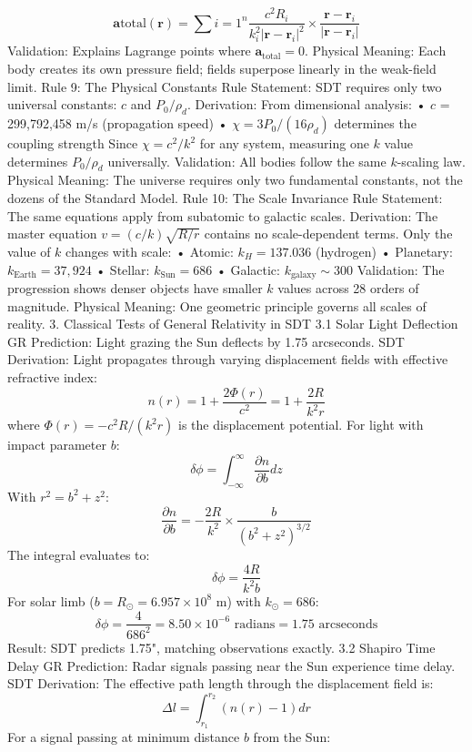 $$\mathbf{a}{\text{total}}(\mathbf{r}) = \sum{i=1}^{n} \frac{c^2R_i}{k_i^2|\mathbf{r} - \mathbf{r}_i|^2} \times \frac{\mathbf{r} - \mathbf{r}_i}{|\mathbf{r} - \mathbf{r}_i|}$$
Validation: Explains Lagrange points where $\mathbf{a}_{\text{total}} = 0$.
Physical Meaning: Each body creates its own pressure field; fields superpose linearly in the weak-field limit.
Rule 9: The Physical Constants Rule
Statement: SDT requires only two universal constants: $c$ and $P_0/\rho_d$.
Derivation: From dimensional analysis:
•	$c$ = 299,792,458 m/s (propagation speed)
•	$\chi = 3P_0/(16\rho_d)$ determines the coupling strength
Since $\chi = c^2/k^2$ for any system, measuring one $k$ value determines $P_0/\rho_d$ universally.
Validation: All bodies follow the same $k$-scaling law.
Physical Meaning: The universe requires only two fundamental constants, not the dozens of the Standard Model.
Rule 10: The Scale Invariance Rule
Statement: The same equations apply from subatomic to galactic scales.
Derivation: The master equation $v = (c/k)\sqrt{R/r}$ contains no scale-dependent terms. Only the value of $k$ changes with scale:
•	Atomic: $k_H = 137.036$ (hydrogen)
•	Planetary: $k_{\text{Earth}} = 37,924$
•	Stellar: $k_{\text{Sun}} = 686$
•	Galactic: $k_{\text{galaxy}} \sim 300$
Validation: The progression shows denser objects have smaller $k$ values across 28 orders of magnitude.
Physical Meaning: One geometric principle governs all scales of reality.
3. Classical Tests of General Relativity in SDT
3.1 Solar Light Deflection
GR Prediction: Light grazing the Sun deflects by 1.75 arcseconds.
SDT Derivation: Light propagates through varying displacement fields with effective refractive index:
$$n(r) = 1 + \frac{2\Phi(r)}{c^2} = 1 + \frac{2R}{k^2r}$$
where $\Phi(r) = -c^2R/(k^2r)$ is the displacement potential.
For light with impact parameter $b$:
$$\delta\phi = \int_{-\infty}^{\infty} \frac{\partial n}{\partial b} dz$$
With $r^2 = b^2 + z^2$:
$$\frac{\partial n}{\partial b} = -\frac{2R}{k^2} \times \frac{b}{(b^2 + z^2)^{3/2}}$$
The integral evaluates to:
$$\delta\phi = \frac{4R}{k^2b}$$
For solar limb ($b = R_{\odot} = 6.957 \times 10^8$ m) with $k_{\odot} = 686$:
$$\delta\phi = \frac{4}{686^2} = 8.50 \times 10^{-6} \text{ radians} = 1.75 \text{ arcseconds}$$
Result: SDT predicts 1.75", matching observations exactly.
3.2 Shapiro Time Delay
GR Prediction: Radar signals passing near the Sun experience time delay.
SDT Derivation: The effective path length through the displacement field is:
$$\Delta l = \int_{r_1}^{r_2} (n(r) - 1) dr$$
For a signal passing at minimum distance $b$ from the Sun:
